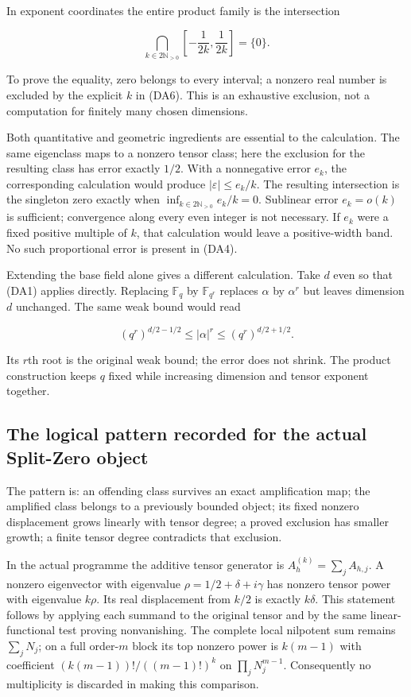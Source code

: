 In exponent coordinates the entire product family is the intersection

\[\bigcap_{k\in2\mathbb N_{>0}}
\left[-\frac1{2k},\frac1{2k}\right]=\{0\}.\tag{DA8}\]

To prove the equality, zero belongs to every interval; a nonzero real
number is excluded by the explicit \(k\) in (DA6). This is an exhaustive
exclusion, not a computation for finitely many chosen dimensions.

Both quantitative and geometric ingredients are essential to the
calculation. The same eigenclass maps to a nonzero tensor class; here
the exclusion for the resulting class has error exactly \(1/2\). With a
nonnegative error \(e_k\), the corresponding calculation would produce
\(|\varepsilon|\le e_k/k\). The resulting intersection is the singleton
zero exactly when \(\inf_{k\in2\mathbb N_{>0}}e_k/k=0\). Sublinear error
\(e_k=o(k)\) is sufficient; convergence along every even integer is not
necessary. If \(e_k\) were a fixed positive multiple of \(k\), that
calculation would leave a positive-width band. No such proportional
error is present in (DA4).

Extending the base field alone gives a different calculation. Take \(d\)
even so that (DA1) applies directly. Replacing \(\mathbb F_q\) by
\(\mathbb F_{q^r}\) replaces \(\alpha\) by \(\alpha^r\) but leaves
dimension \(d\) unchanged. The same weak bound would read

\[(q^r)^{d/2-1/2}\le|\alpha|^r\le(q^r)^{d/2+1/2}.\]

Its \(r\)th root is the original weak bound; the error does not shrink.
The product construction keeps \(q\) fixed while increasing dimension
and tensor exponent together.

\subsection{The logical pattern recorded for the actual Split-Zero
object}\label{CFStage:the-logical-pattern-recorded-for-the-actual-split-zero-object}

The pattern is: an offending class survives an exact amplification map;
the amplified class belongs to a previously bounded object; its fixed
nonzero displacement grows linearly with tensor degree; a proved
exclusion has smaller growth; a finite tensor degree contradicts that
exclusion.

In the actual programme the additive tensor generator is
\(A_h^{(k)}=\sum_j A_{h,j}\). A nonzero eigenvector with eigenvalue
\(\rho=1/2+\delta+i\gamma\) has nonzero tensor power with eigenvalue
\(k\rho\). Its real displacement from \(k/2\) is exactly \(k\delta\).
This statement follows by applying each summand to the original tensor
and by the same linear-functional test proving nonvanishing. The
complete local nilpotent sum remains \(\sum_jN_j\); on a full
order-\(m\) block its top nonzero power is \(k(m-1)\) with coefficient
\((k(m-1))!/((m-1)!)^k\) on \(\prod_jN_j^{m-1}\). Consequently no
multiplicity is discarded in making this comparison.


